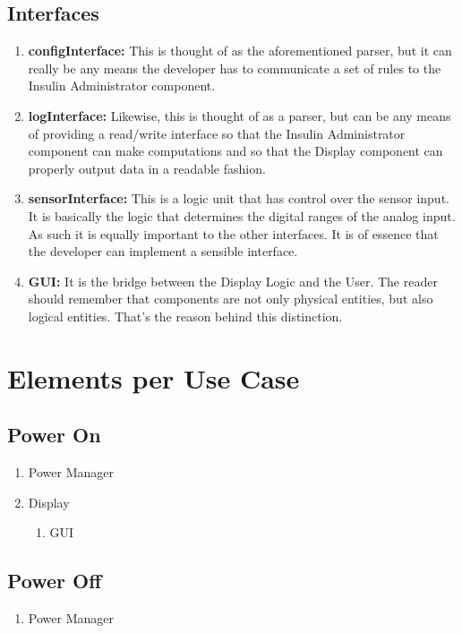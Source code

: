 \documentclass{scrreprt}
\begin{document}
\subsection{Interfaces}
\begin{enumerate}
    \item \textbf{configInterface:} This is thought of as the aforementioned parser, but it can really be any means the developer has to communicate a set of rules to the Insulin Administrator component.
    \item \textbf{logInterface:} Likewise, this is thought of as a parser, but can be any means of providing a read/write interface so that the Insulin Administrator component can make computations and so that the Display
        component can properly output data in a readable fashion.
    \item \textbf{sensorInterface:} This is a logic unit that has control over the sensor input. It is basically the logic that determines the digital ranges of the analog input. As such it is equally important to the
        other interfaces. It is of essence that the developer can implement a sensible interface.
    \item \textbf{GUI:} It is the bridge between the Display Logic and the User. The reader should remember that components are not only physical entities, but also logical entities. That's the reason behind this 
        distinction.
\end{enumerate}

\section{Elements per Use Case}

\subsection{Power On}
\begin{enumerate}
    \item Power Manager  
    \item Display
        \begin{enumerate}
            \item GUI
        \end{enumerate}
\end{enumerate}

\subsection{Power Off}
\begin{enumerate}
    \item Power Manager 
\end{enumerate}
\end{document}

